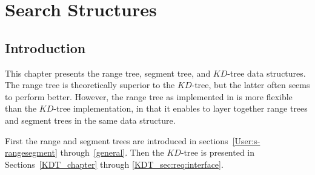 \def\ccTagRmEigenClassName{\ccFalse}
\def\ccLongParamLayout{\ccTrue}

\ccThreeToTwo


\ccThreeToTwo


\chapter{Search Structures} \label{Trees}

\section{Introduction}

This chapter presents the {\cgal} range tree, segment tree, and $KD$-tree 
data structures. 
The range tree is theoretically superior to the $KD$-tree, but the 
latter often seems to perform better.
However, the range tree as implemented in {\cgal} is more flexible than the
$KD$-tree implementation, in that it enables to layer together range trees 
and segment trees in the same data structure.

First the range and segment trees are introduced in 
sections~\ref{User:s-rangesegment} through~\ref{general}.
Then the $KD$-tree is presented in Sections~\ref{KDT_chapter} through
\ref{KDT_sec:req:interface}.






%
%
